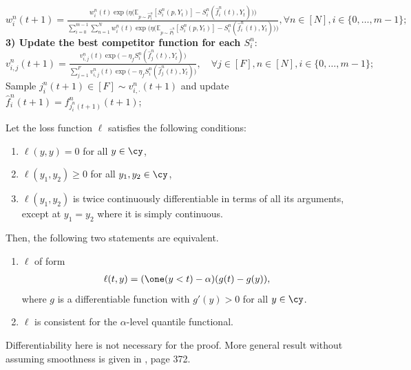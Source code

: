 \begin{algorithm}
\begin{algorithmic}[1]
            \State $w_i^n(t+1) = \frac{w_i^n(t) \exp\bigl(\eta \big(\mathbb{E}_{p \sim \hat{P}_t^n}[S_i^n(p, Y_t)] 
            - S_i^n(\hat{f}_i^n(t), Y_t)\big)\bigr)}{\sum_{i=0}^{m-1} \sum_{n=1}^N w_i^n(t) \exp\bigl(\eta \big(\mathbb{E}_{p \sim \hat{P}_t^n}[S_i^n(p, Y_t)] - S_i^n(\hat{f}_i^n(t), Y_t)\big)\bigr)}, \forall n \in [N], i \in \{0, \ldots, m-1\};$ \vspace{-0.1cm}\\
        \State \textbf{3) Update the best competitor function for each $S_{i}^n$}:
        \State $v_{i,j}^n(t+1) = \frac{v_{i,j}^n(t) \exp\bigl(-\eta_f S_i^n(\hat{f}_j^n(t), Y_t)\bigr)}{\sum_{j=1}^F v_{i,j}^n(t) \exp\bigl(-\eta_f S_i^n(\hat{f}_j^n(t), Y_t)\bigr)}, \quad \forall j \in [F], n \in [N], i \in \{0, \ldots, m-1\};$
            \State Sample $j_i^n(t+1) \in [F] \sim v_{i,\cdot}^n(t+1)$ and update $\hat{f}_i^n(t+1) = f_{j_i^n(t+1)}^n(t+1)$;
          \EndFor
        \EndFor
    \EndFor
    \end{algorithmic}
    \end{algorithm}
    




\begin{theorem}
  Let the loss function $\ell$ satisfies the following conditions:
  \begin{enumerate}
      \item[(i)] $\ell(y, y) = 0$ for all $y \in \cy$,
      \item[(ii)] $\ell(y_1, y_2) \geq 0$ for all $y_1, y_2 \in \cy$,
      \item[(iii)] $\ell(y_1, y_2)$ is twice continuously differentiable in terms of all its arguments, except at $y_1 = y_2$ where it is simply continuous.
  \end{enumerate}
  Then, the following two statements are equivalent.
  \begin{enumerate}
      \item $\ell$ of form
          \begin{align}\label{eq:consistent-repr}
          \ell(t, y) = (\one(y<t) - \alpha)(g(t)-g(y)),
          \end{align}
          where $g$ is a differentiable function with $g'(y) > 0$ for all $y \in \cy$.
      \item $\ell$ is consistent for the $\alpha$-level quantile functional.
  \end{enumerate}
\end{theorem}
Differentiability here is not necessary for the proof. More general result without assuming smoothness is given in \cite{Thomson_1979}, page 372.
  



